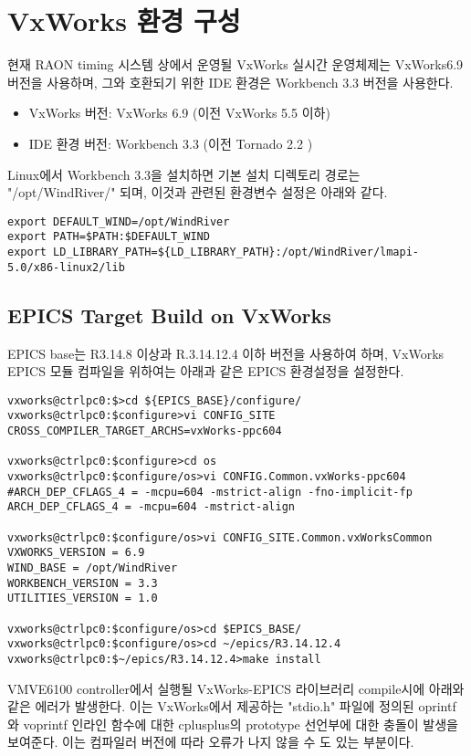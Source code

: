 \documentclass[11pt
  , a4paper
  , article
  , oneside
]{memoir}
\begin{document}
\chapter{VxWorks 환경 구성}
현재 RAON timing 시스템 상에서 운영될 VxWorks 실시간 운영체제는 VxWorks6.9 버전을 사용하며, 그와 호환되기 위한 IDE 환경은 Workbench 3.3 버전을 사용한다.


\begin{itemize}
	\item VxWorks 버전: VxWorks 6.9 (이전 VxWorks 5.5 이하)
	\item IDE 환경 버전: Workbench 3.3 (이전 Tornado 2.2 )
\end{itemize}

Linux에서 Workbench 3.3을 설치하면 기본 설치 디렉토리 경로는 "/opt/WindRiver/" 되며, 이것과 관련된 환경변수 설정은 아래와 같다.

\begin{lstlisting}[style=termstyle]
export DEFAULT_WIND=/opt/WindRiver
export PATH=$PATH:$DEFAULT_WIND
export LD_LIBRARY_PATH=${LD_LIBRARY_PATH}:/opt/WindRiver/lmapi-5.0/x86-linux2/lib
\end{lstlisting}

\section{EPICS Target Build on VxWorks}
EPICS base는 R3.14.8 이상과 R.3.14.12.4 이하 버전을 사용하여 하며, VxWorks EPICS 모듈 컴파일을 위하여는 아래과 같은 EPICS 환경설정을 설정한다.

\begin{lstlisting}[style=termstyle]
vxworks@ctrlpc0:$>cd ${EPICS_BASE}/configure/
vxworks@ctrlpc0:$configure>vi CONFIG_SITE
CROSS_COMPILER_TARGET_ARCHS=vxWorks-ppc604

vxworks@ctrlpc0:$configure>cd os
vxworks@ctrlpc0:$configure/os>vi CONFIG.Common.vxWorks-ppc604
#ARCH_DEP_CFLAGS_4 = -mcpu=604 -mstrict-align -fno-implicit-fp
ARCH_DEP_CFLAGS_4 = -mcpu=604 -mstrict-align

vxworks@ctrlpc0:$configure/os>vi CONFIG_SITE.Common.vxWorksCommon
VXWORKS_VERSION = 6.9
WIND_BASE = /opt/WindRiver
WORKBENCH_VERSION = 3.3
UTILITIES_VERSION = 1.0

vxworks@ctrlpc0:$configure/os>cd $EPICS_BASE/
vxworks@ctrlpc0:$configure/os>cd ~/epics/R3.14.12.4
vxworks@ctrlpc0:$~/epics/R3.14.12.4>make install
\end{lstlisting}

VMVE6100 controller에서 실행될 VxWorks-EPICS 라이브러리 compile시에 아래와 같은 에러가 발생한다. 이는 VxWorks에서 제공하는 "stdio.h" 파일에 정의된 oprintf와 voprintf 인라인 함수에 대한 cplusplus의 prototype 선언부에 대한 충돌이 발생을 보여준다. 이는 컴파일러 버전에 따라 오류가 나지 않을 수 도 있는 부분이다. 
\end{document}
